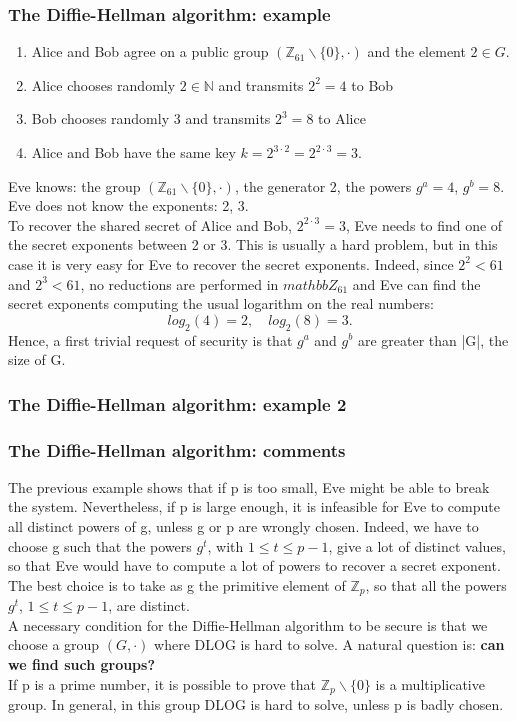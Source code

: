\documentclass[a4paper, 10pt, titlepage]{article}
\begin{document}
\subsubsection*{The Diffie-Hellman algorithm: example}
\begin{enumerate}
\item Alice and Bob agree on a public group $(\mathbb{Z}_{61} \backslash \{0\}, \cdot)$ and the element $2 \in G$.
\item Alice chooses randomly $2 \in \mathbb{N}$ and transmits $2^2 = 4$ to Bob
\item Bob chooses randomly $3$ and transmits $2^3 = 8$ to Alice
\item Alice and Bob have the same key $k = 2^{3\cdot2} = 2^{2\cdot3} = 3$.
\end{enumerate}
Eve knows: the group $(\mathbb{Z}_{61} \backslash \{0\}, \cdot)$, the generator 2, the powers $g^a = 4$, $g^b = 8$.\\
Eve does not know the exponents: 2, 3. \\
To recover the shared secret of Alice and Bob, $2^{2\cdot3} = 3$, Eve needs to find one of the secret exponents between 2 or 3. This is usually a hard problem, but in this case it is very easy for Eve to
recover the secret exponents. Indeed, since $2^2 < 61$ and $2^3 < 61$, no reductions are performed in $mathbb{Z}_61$ and Eve can find the secret exponents computing the usual logarithm on the real numbers:
$$log_2(4) = 2, \quad log_2(8) = 3.$$
Hence, a first trivial request of security is that $g^a$ and $g^b$ are greater than |G|, the size of G.

\subsubsection*{The Diffie-Hellman algorithm: example 2}
\subsubsection*{The Diffie-Hellman algorithm: comments}
The previous example shows that if p is too small, Eve might be able to break the system. Nevertheless, if p is large enough, it is infeasible for Eve to compute all distinct powers of g, unless g or p are wrongly chosen. Indeed, we have to choose g such that the powers $g^t$, with $1 \leq t \leq p - 1$, give a lot of distinct values, so that Eve would have to compute a lot of powers to recover a secret exponent. The best choice is to take as g the primitive element of $\mathbb{Z}_p$, so that all the powers $g^t$, $1 \leq t \leq p - 1$, are distinct.\\
A necessary condition for the Diffie-Hellman algorithm to be secure is that we choose a group $(G, \cdot)$ where DLOG is hard to solve.
A natural question is: \textbf{can we find such groups?}\\
If p is a prime number, it is possible to prove that $\mathbb{Z}_p \backslash \{0\}$ is a multiplicative group. In general, in this group DLOG is hard to solve, unless p is badly chosen.
\end{document}
